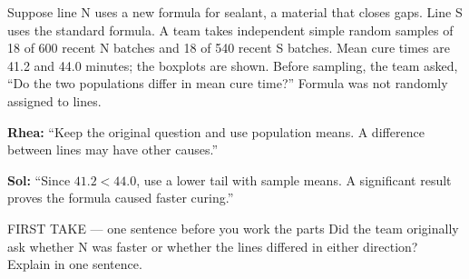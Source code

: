 \documentclass[14pt]{extarticle}
\begin{document}
\pagestyle{empty}


\noindent\begin{minipage}[t]{0.57\linewidth}
\vspace{0pt}
Suppose line N uses a new formula for sealant, a material that closes gaps. Line S uses the standard formula. A team takes independent simple random samples of 18 of 600 recent N batches and 18 of 540 recent S batches. Mean cure times are 41.2 and 44.0 minutes; the boxplots are shown. Before sampling, the team asked, ``Do the two populations differ in mean cure time?'' Formula was not randomly assigned to lines.\par\smallskip \textbf{Rhea:} ``Keep the original question and use population means. A difference between lines may have other causes.''\par \textbf{Sol:} ``Since $41.2<44.0$, use a lower tail with sample means. A significant result proves the formula caused faster curing.''\par
\end{minipage}\hfill
\begin{minipage}[t]{0.40\linewidth}
\vspace{0pt}
\begin{center}
\end{center}
\end{minipage}

\begin{firsttakebox}{FIRST TAKE --- one sentence before you work the parts}
Did the team originally ask whether N was faster or whether the lines differed in either direction? Explain in one sentence.
\end{firsttakebox}
\end{document}
